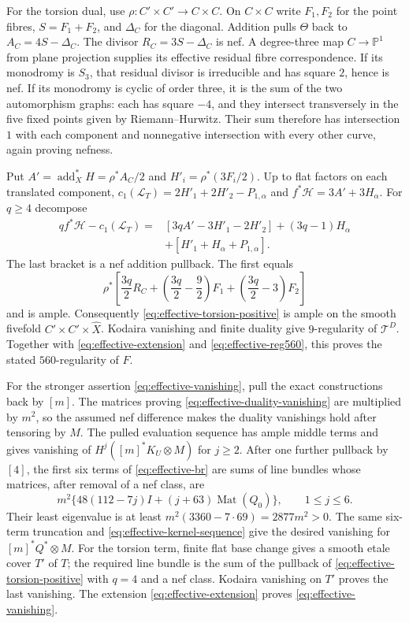 \documentclass[11pt]{article}
\theoremstyle{definition}
\theoremstyle{remark}
\begin{document}
For the torsion dual, use $\rho:C'\times C'\to C\times C$.
On $C\times C$ write $F_1,F_2$ for the point fibres,
$S=F_1+F_2$, and $\Delta_C$ for the diagonal. Addition pulls
$\Theta$ back to $A_C=4S-\Delta_C$. The divisor
$R_C=3S-\Delta_C$ is nef. A degree-three map $C\to\mathbb P^1$
from plane projection supplies its effective residual fibre
correspondence. If its monodromy is $S_3$, that residual divisor
is irreducible and has square $2$, hence is nef. If its monodromy
is cyclic of order three, it is the sum of the two automorphism
graphs: each has square $-4$, and they intersect transversely
in the five fixed points given by Riemann--Hurwitz. Their sum
therefore has intersection $1$ with each component and nonnegative
intersection with every other curve, again proving nefness.

Put $A'=\operatorname{add}_X^*H=\rho^*A_C/2$ and
$H'_i=\rho^*(3F_i/2)$. Up to flat factors on each translated
component,
$c_1(\mathcal L_T)=2H'_1+2H'_2-P_{1,\alpha}$ and
$f^*\mathcal H=3A'+3H_\alpha$. For $q\ge4$ decompose
\begin{equation}\label{eq:effective-torsion-positive}
 \begin{split}
 qf^*\mathcal H-c_1(\mathcal L_T)
 ={}&[3qA'-3H'_1-2H'_2]+(3q-1)H_\alpha\\
    &+[H'_1+H_\alpha+P_{1,\alpha}].
 \end{split}                                               
\end{equation}
The last bracket is a nef addition pullback. The first equals
\[
 \rho^*\left[\frac{3q}{2}R_C+
       \left(\frac{3q}{2}-\frac92\right)F_1+
       \left(\frac{3q}{2}-3\right)F_2\right]
\]
and is ample. Consequently \eqref{eq:effective-torsion-positive} is ample on the smooth
fivefold $C'\times C'\times\widehat X$. Kodaira vanishing and
finite duality give $9$-regularity of $\mathcal T^D$.
Together with \eqref{eq:effective-extension} and \eqref{eq:effective-reg560}, this proves the stated
$560$-regularity of $F$.

For the stronger assertion \eqref{eq:effective-vanishing}, pull the exact constructions
back by $[m]$. The matrices proving \eqref{eq:effective-duality-vanishing} are multiplied by
$m^2$, so the assumed nef difference makes the duality
vanishings hold after tensoring by $M$. The pulled evaluation
sequence has ample middle terms and gives vanishing of
$H^j([m]^*K_U\otimes M)$ for $j\ge2$.
After one further pullback by $[4]$, the first six terms of
\eqref{eq:effective-br} are sums of line bundles whose matrices, after removal
of a nef class, are
\[
 m^2\{48(112-7j)I+(j+63)\operatorname{Mat}(Q_0)\},
 \qquad1\le j\le6.
\]
Their least eigenvalue is at least
$m^2(3360-7\cdot69)=2877m^2>0$. The same six-term truncation
and \eqref{eq:effective-kernel-sequence} give the desired vanishing for $[m]^*Q^*\otimes M$.
For the torsion term, finite flat base change gives a smooth
etale cover $T'$ of $T$; the required line bundle is the sum
of the pullback of \eqref{eq:effective-torsion-positive} with $q=4$ and a nef class.
Kodaira vanishing on $T'$ proves the last vanishing.
The extension \eqref{eq:effective-extension} proves \eqref{eq:effective-vanishing}.
\end{document}
